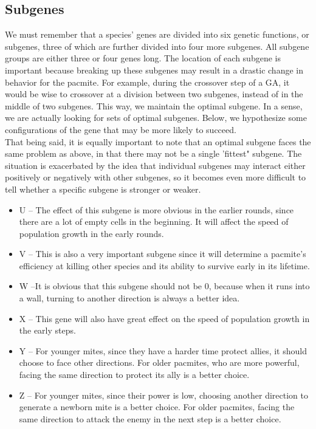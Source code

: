 \documentclass[twoside]{article}
\begin{document}
\begin{multicols}{2}
\subsection{Subgenes}
We must remember that a species' genes are divided into six genetic functions, or subgenes, three of which are further divided into four more subgenes. All subgene groups are either three or four genes long. The location of each subgene is important because breaking up these subgenes may result in a drastic change in behavior for the pacmite. For example, during the crossover step of a GA, it would be wise to crossover at a division between two subgenes, instead of in the middle of two subgenes. This way, we maintain the optimal subgene. In a sense, we are actually looking for sets of optimal subgenes. Below, we hypothesize some configurations of the gene that may be more likely to succeed. 
\\\indent That being said, it is equally important to note that an optimal subgene faces the same problem as above, in that there may not be a single 'fittest" subgene. The situation is exacerbated by the idea that individual subgenes may interact either positively or negatively with other subgenes, so it becomes even more difficult to tell whether a specific subgene is stronger or weaker. 
\begin{itemize}
	\item U -- The effect of this subgene is more obvious in the earlier rounds, since there are a lot of empty cells in the beginning. It will affect the speed of population growth in the early rounds.
	\item V -- This is also a very important subgene since it will determine a pacmite's efficiency at killing other species and its ability to survive early in its lifetime.
	\item W --It is obvious that this subgene should not be 0, because when it runs into a wall, turning to another direction is always a better idea.
	\item X -- This gene will also have great effect on the speed of population growth in the early steps.
	\item Y -- For younger mites, since they have a harder time protect allies, it should choose to face other directions. For older pacmites, who are more powerful, facing the same direction to protect its ally is a better choice.
	\item Z -- For younger mites, since their power is low,  choosing another direction to generate a newborn mite is a better choice. For older pacmites, facing the same direction to attack the enemy in the next step is a better choice.
\end{itemize}

\end{multicols}
\end{document}

